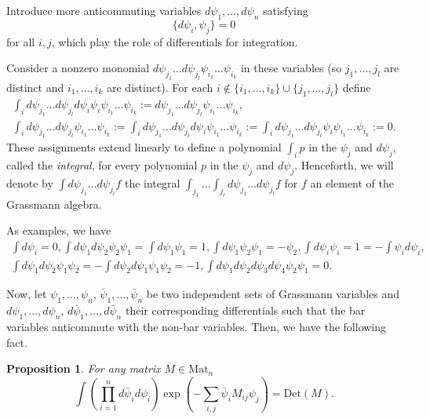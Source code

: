 \documentclass[12pt, reqno]{amsart}
\newtheorem{prop}[theo]{Proposition}
\theoremstyle{definition}
\newcommand{\Det}{\mathrm{Det}}%
\newcommand{\Mat}{\mathrm{Mat}}%
\begin{document}
Introduce more anticommuting variables $d\psi_1,\dots,d\psi_n$ satisfying
$$
\{ d\psi_i, \psi_j \}
= 0
$$
for all {$i,j$}, which play the role of differentials for integration. 

Consider a nonzero monomial $d\psi_{j_1} \dots d\psi_{j_l} \psi_{i_1} \dots \psi_{i_k}$ in these variables (so $j_1,\dots,j_l$ are distinct and $i_1,\dots,i_k$ are distinct). For each $i\notin\{i_1,\dots,i_k\}\cup\{j_1,\dots,j_{l}\}$ define
\begin{gather*}
\int_i d\psi_{j_1} \dots d\psi_{j_{l}} d\psi_{i} \psi_{i} \psi_{i_1} \dots \psi_{i_k} 
:=
d\psi_{j_1} \dots d\psi_{j_{l}} \psi_{i_1} \dots \psi_{i_k},
\\
\int_i d\psi_{j_1} \dots d\psi_{j_l} \psi_{i_1} \dots \psi_{i_k} 
:= \int_i d\psi_{j_1} \dots d\psi_{j_l} d\psi_{i} \psi_{i_1} \dots \psi_{i_k} 
:= \int_i d\psi_{j_1} \dots d\psi_{j_l} \psi_{i} \psi_{i_1} \dots \psi_{i_k} 
:= 0.  
\end{gather*}
These assignments extend linearly to define a polynomial $\int_i p$ in the $\psi_j$ and $d\psi_j$, called the \emph{integral}, for every polynomial $p$ in the $\psi_j$ and $d\psi_j$.  Henceforth, we will denote by $\int d\psi_{j_1} \dots d\psi_{j_{l}} f$ the integral $\int_{j_1} \dots \int_{j_{l}} d\psi_{j_1} \dots  d\psi_{j_{l}} f$ for $f$ an element of the Grassmann algebra.  

As examples, we have
\begin{gather*}
\int d\psi_i = 0, 
\int d\psi_1 d\psi_2  \psi_2 \psi_1 = \int d\psi_1  \psi_1 = 1,
\int d\psi_1  \psi_2 \psi_1 = -\psi_2,
\int d\psi_i \psi_i = 1 = -\int \psi_i d\psi_i,\\
\int d\psi_1 d\psi_2  \psi_1 \psi_2 = -\int d\psi_2 d\psi_1  \psi_1 \psi_2 = -1,
\int d\psi_1 d\psi_2 d\psi_3 d\psi_4  \psi_2 \psi_1 = 0.
\end{gather*}

Now, let $\psi_1,\dots,\psi_n$, $\bar{\psi}_1,\dots,\bar{\psi}_n$ be two independent sets of Grassmann variables and $d\psi_1,\dots,d\psi_n$, $d\bar{\psi}_1,\dots,d\bar{\psi}_n$ their corresponding differentials such that the bar variables anticommute with the non-bar variables. Then, we have the following fact. 

\begin{prop} 
For any matrix $M \in \Mat_{n}$
$$
\int 
\left( \prod_{i=1}^{n} d\bar{\psi}_i d{\psi}_i \right) 
\exp\left(- \sum_{i,j} \bar{\psi}_i M_{ij} \psi_j\right)
= 
\Det(M).
$$
\end{prop}
\end{document}
